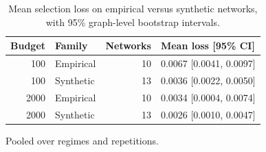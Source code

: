 \begin{table}[htbp]
\centering
\footnotesize
\caption{Mean selection loss on empirical versus synthetic networks, with 95\% graph-level bootstrap intervals.}
\label{tab:family}
\begin{tabular}{r l r l}
\toprule
Budget & Family & Networks & Mean loss [95\% CI] \\
\midrule
100 & Empirical & 10 & 0.0067 [0.0041, 0.0097] \\
100 & Synthetic & 13 & 0.0036 [0.0022, 0.0050] \\
2000 & Empirical & 10 & 0.0034 [0.0004, 0.0074] \\
2000 & Synthetic & 13 & 0.0026 [0.0010, 0.0047] \\
\bottomrule
\end{tabular}
\par\vspace{2pt}\begin{minipage}{\linewidth}\footnotesize Pooled over regimes and repetitions.\end{minipage}
\end{table}
